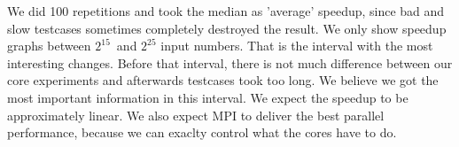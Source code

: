 We did 100 repetitions and took the median as 'average' speedup, since bad and slow testcases sometimes completely destroyed the result. \newline 
We only show speedup graphs between \(2^{15}\)\ and \(2^{25}\) input numbers. That is the interval with the most interesting changes. Before that interval, there is not much difference between our core experiments and afterwards testcases took too long. We believe we got the most important information in this interval.\newline
We expect the speedup to be approximately linear. We also expect MPI to deliver the best parallel performance, because we can exaclty control what the cores have to do. 
